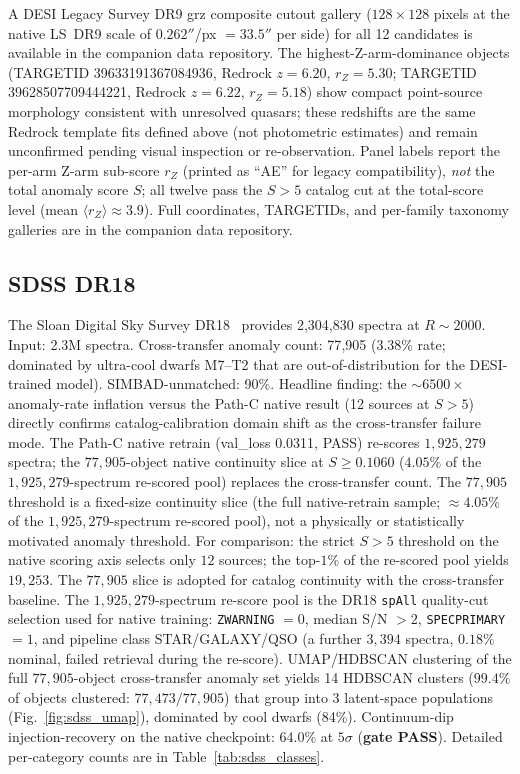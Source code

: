\documentclass[aps,prd,twocolumn,superscriptaddress,showpacs,preprintnumbers,nofootinbib,longbibliography,floatfix]{revtex4-2}
\begin{document}
A DESI Legacy Survey DR9 grz composite cutout gallery ($128\!\times\!128$ pixels at the native LS~DR9 scale of $0.262''$/px $= 33.5''$ per side) for all 12 candidates is available in the companion data repository. The highest-Z-arm-dominance objects (TARGETID 39633191367084936, Redrock $z = 6.20$, $r_Z = 5.30$; TARGETID 39628507709444221, Redrock $z = 6.22$, $r_Z = 5.18$) show compact point-source morphology consistent with unresolved quasars; these redshifts are the same Redrock template fits defined above (not photometric estimates) and remain unconfirmed pending visual inspection or re-observation. Panel labels report the per-arm Z-arm sub-score $r_Z$ (printed as ``AE'' for legacy compatibility), \emph{not} the total anomaly score $S$; all twelve pass the $S > 5$ catalog cut at the total-score level (mean $\langle r_Z \rangle \approx 3.9$). Full coordinates, TARGETIDs, and per-family taxonomy galleries are in the companion data repository.


\subsection{SDSS DR18}\label{sec:sdss}

The Sloan Digital Sky Survey DR18~\cite{SDSS_DR18} provides 2{,}304{,}830 spectra at $R \sim 2000$. Input: 2.3M spectra. Cross-transfer anomaly count: 77{,}905 (3.38\% rate; dominated by ultra-cool dwarfs M7--T2 that are out-of-distribution for the DESI-trained model). SIMBAD-unmatched: 90\%. Headline finding: the $\sim\!6500\times$ anomaly-rate inflation versus the Path-C native result (12 sources at $S>5$) directly confirms catalog-calibration domain shift as the cross-transfer failure mode. The Path-C native retrain (val\_loss 0.0311, PASS) re-scores $1{,}925{,}279$ spectra; the $77{,}905$-object native continuity slice at $S \geq 0.1060$ ($4.05\%$ of the $1{,}925{,}279$-spectrum re-scored pool) replaces the cross-transfer count. The $77{,}905$ threshold is a fixed-size continuity slice (the full native-retrain sample; ${\approx}4.05\%$ of the $1{,}925{,}279$-spectrum re-scored pool), not a physically or statistically motivated anomaly threshold. For comparison: the strict $S>5$ threshold on the native scoring axis selects only $12$ sources; the top-$1\%$ of the re-scored pool yields $19{,}253$. The $77{,}905$ slice is adopted for catalog continuity with the cross-transfer baseline. The $1{,}925{,}279$-spectrum re-score pool is the DR18 \texttt{spAll} quality-cut selection used for native training: \texttt{ZWARNING} $= 0$, median S/N $> 2$, \texttt{SPECPRIMARY} $= 1$, and pipeline class STAR/GALAXY/QSO (a further $3{,}394$ spectra, $0.18\%$ nominal, failed retrieval during the re-score). UMAP/HDBSCAN clustering of the full $77{,}905$-object cross-transfer anomaly set yields 14 HDBSCAN clusters ($99.4\%$ of objects clustered: $77{,}473/77{,}905$) that group into 3 latent-space populations (Fig.~\ref{fig:sdss_umap}), dominated by cool dwarfs (84\%). Continuum-dip injection-recovery on the native checkpoint: 64.0\% at $5\sigma$ (\textbf{gate PASS}). Detailed per-category counts are in Table~\ref{tab:sdss_classes}.
\end{document}
